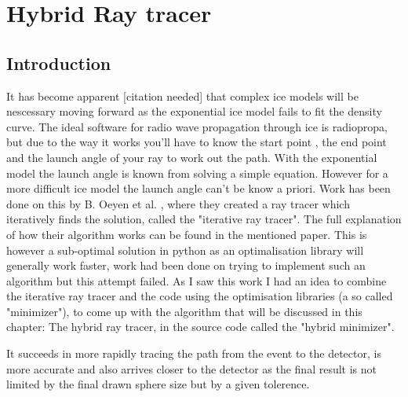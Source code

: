 \documentclass[11pt,a4paper,faculty=we,language=en,doctype=report]{cls/ugent-doc}
\begin{document}
\chapter{Hybrid Ray tracer}
\section{Introduction}
It has become apparent [citation needed] that complex ice models will be nescessary moving forward 
as the exponential ice model fails to fit the density curve. 
The ideal software for radio wave propagation through
ice is radiopropa\cite{Winchen_2019}, but due to the way it works you'll have
to know the start point , the end point and the launch angle of your ray to
work out the path. With the exponential model the launch angle is known from solving a simple 
equation.
However for a more difficult ice model the launch angle can't be know a priori.
Work has been done on this by B. Oeyen et al. \cite{2022icrc.confE1027O}, 
where they created a ray tracer which iteratively finds the solution, 
called the "iterative ray tracer".
The full explanation of how their algorithm works can be found in the mentioned paper. 
This is however a sub-optimal solution in python as an optimalisation library 
will generally work faster, work
had been done on trying to implement such an algorithm but this attempt failed.
As I saw this work I had an idea to combine the iterative ray tracer and the code using the 
optimisation libraries (a so called "minimizer"), to come up with the algorithm that will 
be discussed in this chapter: The hybrid ray tracer, in the source code called the "hybrid
minimizer".

It succeeds in more rapidly tracing the path from the event
to the detector, is more accurate and also arrives closer to the detector as the final result is
not limited by the final drawn sphere size but by a given tolerence.
\end{document}
